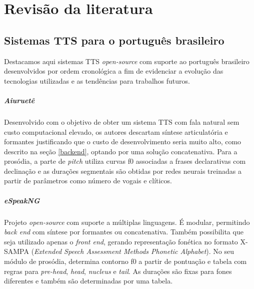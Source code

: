 

\chapter{Revisão da literatura}


\section{Sistemas TTS para o português brasileiro}
\label{sistemas}

Destacamos aqui sistemas TTS \emph{open-source} com suporte ao português
brasileiro desenvolvidos por ordem cronológica a fim de evidenciar a evolução
das tecnologias utilizadas e as tendências para trabalhos futuros.

\paragraph{Aiuruetê \cite{aiuruete}}
Desenvolvido com o objetivo de obter um sistema TTS com fala natural sem custo
computacional elevado, os autores descartam síntese articulatória e formantes
justificando que o custo de desenvolvimento seria muito alto, como descrito na
seção \ref{backend}, optando por uma solução concatenativa. Para a prosódia, a
parte de \emph{pitch} utiliza curvas f0 associadas a frases declarativas com
declinação e as durações segmentais são obtidas por redes neurais treinadas a
partir de parâmetros como número de vogais e clíticos.

\paragraph{eSpeakNG \cite{espeakng}}
Projeto \emph{open-source} com suporte a múltiplas linguagens. É modular,
permitindo \emph{back end} com síntese por formantes ou concatenativa. Também
possibilita que seja utilizado apenas o \emph{front end}, gerando representação
fonética no formato X-SAMPA (\emph{Extended Speech Assessment Methods Phonetic
Alphabet}). No seu módulo de prosódia, determina contorno f0 a partir de
pontuação e tabela com regras para \emph{pre-head}, \emph{head}, \emph{nucleus}
e \emph{tail}. As durações são fixas para fones diferentes e também são
determinadas por uma tabela.

